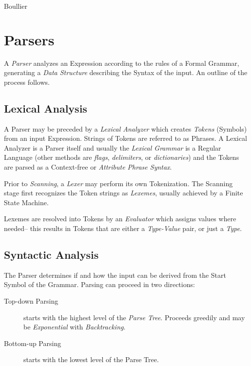 \documentclass{article}
\begin{document}
Boullier\cite{boullier94}


\section{Parsers} \label{sec:parsers}

A \emph{Parser} analyzes an Expression according to the rules of a Formal
Grammar, generating a \emph{Data Structure} describing the Syntax of
the input. An outline of the process follows.

\subsection{Lexical Analysis}

A Parser may be preceded by a \emph{Lexical Analyzer} which creates
\emph{Tokens} (Symbols) from an input Expression. Strings of Tokens
are referred to as Phrases. A Lexical Analyzer is a Parser itself and
usually the \emph{Lexical Grammar} is a Regular Language (other
methods are \emph{flags}, \emph{delimiters}, or \emph{dictionaries})
and the Tokens are parsed as a Context-free or \emph{Attribute Phrase
  Syntax}.

Prior to \emph{Scanning}, a \emph{Lexer} may perform its own
Tokenization.  The Scanning stage first recognizes the Token
strings as \emph{Lexemes}, usually achieved by a Finite State
Machine.

Lexemes are resolved into Tokens by an \emph{Evaluator} which assigns
values where needed-- this results in Tokens that are either a
\emph{Type-Value} pair, or just a \emph{Type}.

\subsection{Syntactic Analysis}

The Parser determines if and how the input can be derived from the
Start Symbol of the Grammar. Parsing can proceed in two directions:

\begin{description}
    \item[Top-down Parsing]
    starts with the highest level of the \emph{Parse Tree}. Proceeds greedily
    and may be \emph{Exponential} with \emph{Backtracking}.
    \item[Bottom-up Parsing]
    starts with the lowest level of the Parse Tree.
\end{description}
\end{document}
